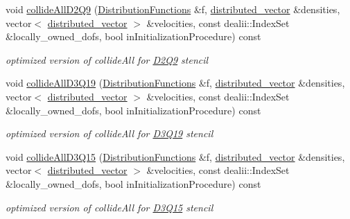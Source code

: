 \begin{DoxyCompactItemize}
void \hyperlink{classnatrium_1_1BGKStandard_aaaad49afea2e7079645b49380d990254}{collideAllD2Q9} (\hyperlink{classnatrium_1_1DistributionFunctions}{DistributionFunctions} \&f, \hyperlink{namespacenatrium_a903d2b92917f582f2ff05f52160ab811}{distributed\_\-vector} \&densities, vector$<$ \hyperlink{namespacenatrium_a903d2b92917f582f2ff05f52160ab811}{distributed\_\-vector} $>$ \&velocities, const dealii::IndexSet \&locally\_\-owned\_\-dofs, bool inInitializationProcedure) const 
\begin{DoxyCompactList}\small\item\em optimized version of collideAll for \hyperlink{classnatrium_1_1D2Q9}{D2Q9} stencil \item\end{DoxyCompactList}\item 
\hypertarget{classnatrium_1_1BGKStandard_a7362ff8603390301e8c4062ad348edd1}{
void \hyperlink{classnatrium_1_1BGKStandard_a7362ff8603390301e8c4062ad348edd1}{collideAllD3Q19} (\hyperlink{classnatrium_1_1DistributionFunctions}{DistributionFunctions} \&f, \hyperlink{namespacenatrium_a903d2b92917f582f2ff05f52160ab811}{distributed\_\-vector} \&densities, vector$<$ \hyperlink{namespacenatrium_a903d2b92917f582f2ff05f52160ab811}{distributed\_\-vector} $>$ \&velocities, const dealii::IndexSet \&locally\_\-owned\_\-dofs, bool inInitializationProcedure) const }
\label{classnatrium_1_1BGKStandard_a7362ff8603390301e8c4062ad348edd1}

\begin{DoxyCompactList}\small\item\em optimized version of collideAll for \hyperlink{classnatrium_1_1D3Q19}{D3Q19} stencil \item\end{DoxyCompactList}\item 
\hypertarget{classnatrium_1_1BGKStandard_a6ffd7d81aef7a233dd44c46eb539e833}{
void \hyperlink{classnatrium_1_1BGKStandard_a6ffd7d81aef7a233dd44c46eb539e833}{collideAllD3Q15} (\hyperlink{classnatrium_1_1DistributionFunctions}{DistributionFunctions} \&f, \hyperlink{namespacenatrium_a903d2b92917f582f2ff05f52160ab811}{distributed\_\-vector} \&densities, vector$<$ \hyperlink{namespacenatrium_a903d2b92917f582f2ff05f52160ab811}{distributed\_\-vector} $>$ \&velocities, const dealii::IndexSet \&locally\_\-owned\_\-dofs, bool inInitializationProcedure) const }
\label{classnatrium_1_1BGKStandard_a6ffd7d81aef7a233dd44c46eb539e833}

\begin{DoxyCompactList}\small\item\em optimized version of collideAll for \hyperlink{classnatrium_1_1D3Q15}{D3Q15} stencil \item\end{DoxyCompactList}\end{DoxyCompactItemize}


